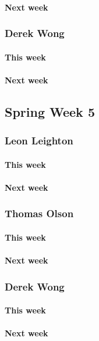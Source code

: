 \documentclass[10pt,letterpaper,onecolumn,draftclsnofoot]{IEEEtran}
\begin{document}
\paragraph{Next week}


\subsubsection{Derek Wong}
\paragraph{This week}
\paragraph{Next week}


\subsection{Spring Week 5}
\subsubsection{Leon Leighton}
\paragraph{This week}
\paragraph{Next week}


\subsubsection{Thomas Olson}
\paragraph{This week}
\paragraph{Next week}


\subsubsection{Derek Wong}
\paragraph{This week}
\paragraph{Next week}
\end{document}
